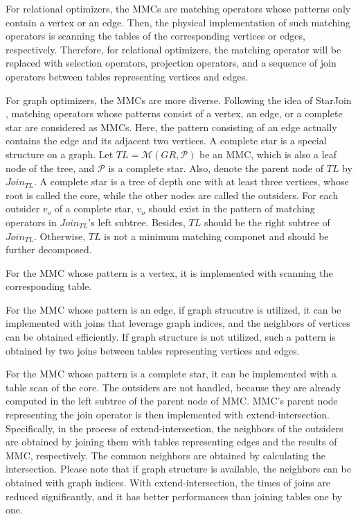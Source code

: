 For relational optimizers, the MMCs are matching operators whose patterns only contain a vertex or an edge.
Then, the physical implementation of such matching operators is scanning the tables of the corresponding vertices or edges, respectively.
Therefore, for relational optimizers, the matching operator will be replaced with selection operators, projection operators, and a sequence of join operators between tables representing vertices and edges.

For graph optimizers, the MMCs are more diverse.
Following the idea of StarJoin \cite{starjoin,huge}, matching operators whose patterns consist of a vertex, an edge, or a complete star are considered as MMCs.
Here, the pattern consisting of an edge actually contains the edge and its adjacent two vertices.
A complete star is a special structure on a graph.
Let $TL = \mathcal{M}(GR, \mathcal{P})$ be an MMC, which is also a leaf node of the tree, and $\mathcal{P}$ is a complete star.
Also, denote the parent node of $TL$ by $Join_{TL}$.
A complete star is a tree of depth one with at least three vertices, whose root is called the core, while the other nodes are called the outsiders.
For each outsider $v_o$ of a complete star, $v_o$ should exist in the pattern of matching operators in $Join_{TL}$'s left subtree.
Besides, $TL$ should be the right subtree of $Join_{TL}$.
Otherwise, $TL$ is not a minimum matching componet and should be further decomposed.

For the MMC whose pattern is a vertex, it is implemented with scanning the corresponding table.

For the MMC whose pattern is an edge, if graph strucutre is utilized, it can be implemented with joins that leverage graph indices, and the neighbors of vertices can be obtained efficiently.
If graph structure is not utilized, such a pattern is obtained by two joins between tables representing vertices and edges.


For the MMC whose pattern is a complete star, it can be implemented with a table scan of the core.
The outsiders are not handled, because they are already computed in the left subtree of the parent node of MMC.
MMC's parent node representing the join operator is then implemented with extend-intersection.
Specifically, in the process of extend-intersection, the neighbors of the outsiders are obtained by joining them with tables representing edges and the results of MMC, respectively.
The common neighbors are obtained by calculating the intersection.
Please note that if graph structure is available, the neighbors can be obtained with graph indices.
With extend-intersection, the times of joins are reduced significantly, and it has better performances than joining tables one by one.


